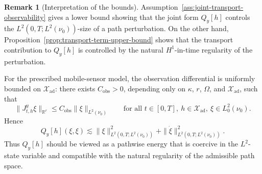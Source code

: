 \documentclass{article}
\theoremstyle{definition}
\newtheorem{remark}[theorem]{Remark}
\begin{document}
\begin{remark}[Interpretation of the bounds]
    \label{rem:joint-form-bounds-interpretation}
    Assumption~\ref{ass:joint-transport-observability} gives a lower bound showing that the joint
    form \(Q_y[h]\) controls the \(L^2(0,T;L^2(\nu_0))\)-size of a path perturbation. On the other
    hand, Proposition~\ref{prop:transport-term-upper-bound} shows that the transport contribution to
    \(Q_y[h]\) is controlled by the natural \(H^1\)-in-time regularity of the perturbation.

    For the prescribed mobile-sensor model, the observation differential is uniformly bounded on
    \(\mathcal X_{\mathrm{ad}}\): there exists \(C_{\mathrm{obs}}>0\), depending only on
    \(\kappa\), \(r\), \(\Omega\), and \(\mathcal X_{\mathrm{ad}}\), such that
    \[
        \|J_{t,h}^{y}\xi\|_{\mathbb R^r}
        \le
        C_{\mathrm{obs}}\|\xi\|_{L^2(\nu_0)}
        \qquad
        \text{for all } t\in[0,T],\ h\in\mathcal X_{\mathrm{ad}},\ \xi\in L^2_0(\nu_0).
    \]
    Hence
    \[
        Q_y[h](\xi,\xi)
        \lesssim
        \|\xi\|_{L^2(0,T;L^2(\nu_0))}^2
        +
        \|\dot\xi\|_{L^2(0,T;L^2(\nu_0))}^2.
    \]
    Thus \(Q_y[h]\) should be viewed as a pathwise energy that is coercive in the \(L^2\)-state
    variable and compatible with the natural regularity of the admissible path space.
\end{remark}
\end{document}

